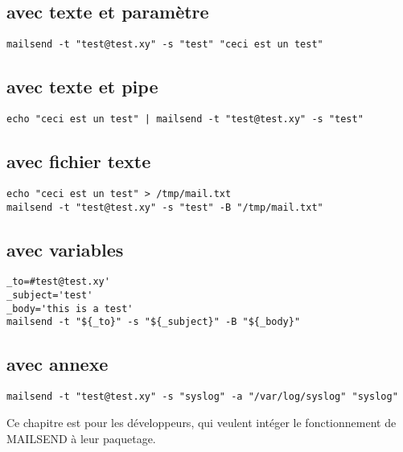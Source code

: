 
\subsection { avec texte et paramètre}
\begin{verbatim}
mailsend -t "test@test.xy" -s "test" "ceci est un test"
\end{verbatim}

\subsection { avec texte et pipe}
\begin{verbatim}
echo "ceci est un test" | mailsend -t "test@test.xy" -s "test"
\end{verbatim}

\subsection { avec fichier texte}
\begin{verbatim}
echo "ceci est un test" > /tmp/mail.txt
mailsend -t "test@test.xy" -s "test" -B "/tmp/mail.txt"
\end{verbatim}

\subsection { avec variables}
\begin{verbatim}
_to=#test@test.xy'
_subject='test'
_body='this is a test'
mailsend -t "${_to}" -s "${_subject}" -B "${_body}"
\end{verbatim}

\subsection { avec annexe}
\begin{verbatim}
mailsend -t "test@test.xy" -s "syslog" -a "/var/log/syslog" "syslog"
\end{verbatim}

    Ce chapitre est pour les développeurs, qui veulent intéger
	le fonctionnement de MAILSEND à leur paquetage.

